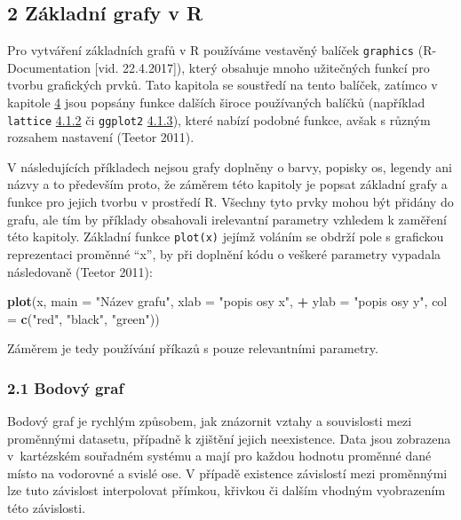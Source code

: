 \documentclass[12pt,]{article}
\newenvironment{Shaded}{\begin{snugshade}}{\end{snugshade}}
\newcommand{\KeywordTok}[1]{\textcolor[rgb]{0.13,0.29,0.53}{\textbf{#1}}}
\newcommand{\DataTypeTok}[1]{\textcolor[rgb]{0.13,0.29,0.53}{#1}}
\newcommand{\StringTok}[1]{\textcolor[rgb]{0.31,0.60,0.02}{#1}}
\newcommand{\OperatorTok}[1]{\textcolor[rgb]{0.81,0.36,0.00}{\textbf{#1}}}
\newcommand{\NormalTok}[1]{#1}
\begin{document}
\hypertarget{base}{\subsection{2 Základní grafy v R}\label{base}}

\qquad Pro vytváření základních grafů v R používáme vestavěný balíček
\texttt{graphics} (R-Documentation {[}vid. 22.4.2017{]}), který obsahuje
mnoho užitečných funkcí pro tvorbu grafických prvků. Tato kapitola se
soustředí na tento balíček, zatímco v kapitole
\protect\hyperlink{pokrocila}{4} jsou popsány funkce dalších široce
používaných balíčků (například \texttt{lattice}
\protect\hyperlink{lattice}{4.1.2} či \texttt{ggplot2}
\protect\hyperlink{ggplot}{4.1.3}), které nabízí podobné funkce, avšak s
různým rozsahem nastavení (Teetor 2011).

\qquad V následujících příkladech nejsou grafy doplněny o barvy, popisky
os, legendy ani názvy a to především proto, že záměrem této kapitoly je
popsat základní grafy a funkce pro jejich tvorbu v prostředí R. Všechny
tyto prvky mohou být přidány do grafu, ale tím by příklady obsahovali
irelevantní parametry vzhledem k zaměření této kapitoly. Základní funkce
\texttt{plot(x)} jejímž voláním se obdrží pole s grafickou reprezentaci
proměnné \enquote{x}, by při doplnění kódu o veškeré parametry vypadala
následovaně (Teetor 2011):

\begin{Shaded}
\begin{Highlighting}[]
\KeywordTok{plot}\NormalTok{(x, }\DataTypeTok{main =} \StringTok{"Název grafu"}\NormalTok{, }\DataTypeTok{xlab =} \StringTok{"popis osy x"}\NormalTok{, }
\OperatorTok{+}\StringTok{    }\DataTypeTok{ylab =} \StringTok{"popis osy y"}\NormalTok{, }\DataTypeTok{col =} \KeywordTok{c}\NormalTok{(}\StringTok{"red"}\NormalTok{, }\StringTok{"black"}\NormalTok{, }\StringTok{"green"}\NormalTok{)) }
\end{Highlighting}
\end{Shaded}

Záměrem je tedy používání příkazů s pouze relevantními parametry.

\hypertarget{scatterplot}{\subsubsection{2.1 Bodový
graf}\label{scatterplot}}

\qquad Bodový graf je rychlým způsobem, jak znázornit vztahy a
souvislosti mezi proměnnými datasetu, případně k zjištění jejich
neexistence. Data jsou zobrazena v~kartézském souřadném systému a mají
pro každou hodnotu proměnné dané místo na vodorovné a svislé ose. V
případě existence závislostí mezi proměnnými lze tuto závislost
interpolovat přímkou, křivkou či dalším vhodným vyobrazením této
závislosti.
\end{document}
